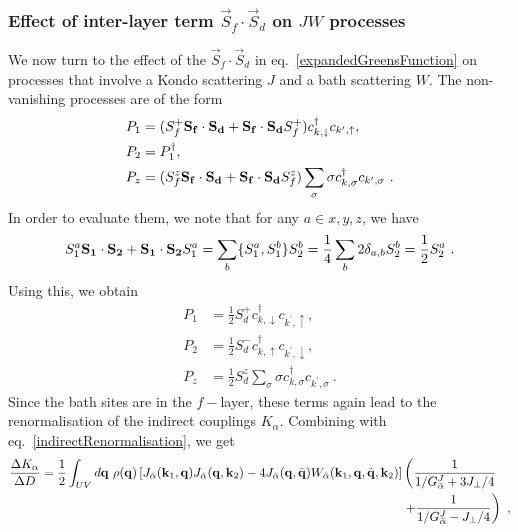\subsubsection*{Effect of inter-layer term \(\vec{S}_f\cdot\vec{S}_d\) on \(JW\) processes}
We now turn to the effect of the \(\vec{S}_f\cdot\vec{S}_d\) in eq.~\ref{expandedGreensFunction} on processes that involve a Kondo scattering \(J\) and a bath scattering \(W\). The non-vanishing processes are of the form
\begin{equation}\begin{aligned}
	P_1 &= (S_f^+ {\bf S_f}\cdot {\bf S_d} + {\bf S_f}\cdot {\bf S_d}S_f^+ )c^\dagger_{k,\downarrow}c_{k^\prime,\uparrow},\\
	P_2 &= P_1^\dagger,\\
	P_z &= (S_f^z {\bf S_f}\cdot {\bf S_d} + {\bf S_f}\cdot {\bf S_d}S_f^z )\sum_\sigma \sigma c^\dagger_{k,\sigma}c_{k^\prime,\sigma}~.
\end{aligned}\end{equation}
In order to evaluate them, we note that for any \(a\in{x,y,z}\), we have
\begin{equation}\begin{aligned}
	S_1^a {\bf S_1}\cdot {\bf S_2} + {\bf S_1}\cdot {\bf S_2} S_1^a = \sum_b \{S_1^a, S_1^b\}S_2^b = \frac{1}{4}\sum_b 2 \delta_{a,b} S_2^b = \frac{1}{2}S_2^a~.
\end{aligned}\end{equation}
Using this, we obtain
\begin{equation}\begin{aligned}
	P_1 &= \frac{1}{2}S_d^+c^\dagger_{k,\downarrow}c_{k^\prime,\uparrow},\\
	P_2 &= \frac{1}{2}S_d^-c^\dagger_{k,\uparrow}c_{k^\prime,\downarrow},\\
	P_z &= \frac{1}{2}S_d^z \sum_\sigma \sigma c^\dagger_{k,\sigma}c_{k^\prime,\sigma}~.
\end{aligned}\end{equation}
Since the bath sites are in the \(f-\)layer, these terms again lead to the renormalisation of the indirect couplings \(K_\alpha\). Combining with eq.~\ref{indirectRenormalisation}, we get
\begin{equation}\begin{aligned}\label{indirectRenorm}
	\frac{\Delta K_\alpha}{\Delta D} = \frac{1}{2}\int_{UV} d{\bf q} ~\rho({\bf q}) \left[J_{\bar\alpha}({\bf k}_1, {\bf q})J_{\bar\alpha}({\bf q}, {\bf k}_2) - 4J_{\bar\alpha}({\bf q}, \bar {\bf q})W_{\bar\alpha}({\bf k}_1, {\bf q}, \bar {\bf q}, {\bf k}_2)\right]& \left(\frac{1}{1/G_{\bar\alpha}^J + 3J_\perp/4}\right.\\
&\left.+ \frac{1}{1/G_{\bar\alpha}^J - J_\perp/4}\right)~,
\end{aligned}\end{equation}

